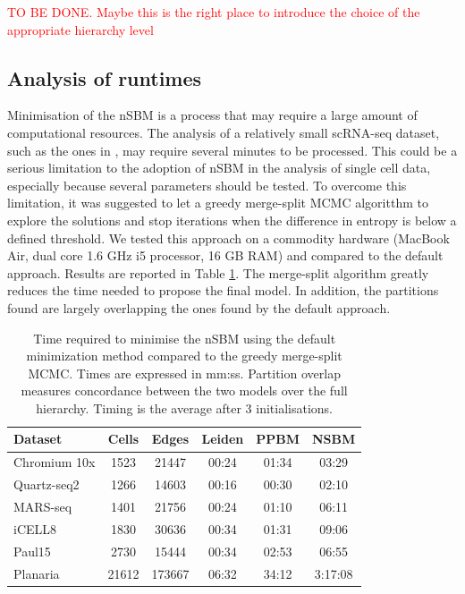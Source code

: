\documentclass[10pt]{article}
\begin{document}
\textcolor{red}{TO BE DONE. Maybe this is the right place to introduce the choice of the appropriate hierarchy level}


\subsection*{Analysis of runtimes}

Minimisation of the nSBM is a process that may require a large amount of computational resources. The analysis of a relatively small scRNA-seq dataset, such as the ones in \cite{mereu_2020}, may require several minutes to be processed. This could be a serious limitation to the adoption of nSBM in the analysis of single cell data, especially because several parameters should be tested. To overcome this limitation, it was suggested to let a greedy merge-split MCMC algoritthm \cite{peixoto_2020} to explore the solutions and stop iterations when the difference in entropy is below a defined threshold. We tested this approach on a commodity hardware (MacBook Air, dual core 1.6 GHz i5 processor, 16 GB RAM) and compared to the default approach. Results are reported in Table \ref{Table1}. The merge-split algorithm greatly reduces the time needed to propose the final model. In addition, the partitions found are largely overlapping the ones found by the default approach. 

\begin{table}[h!]
\centering
 \begin{tabular}{|| l c c c c c ||}
 \hline
 \textbf{Dataset} & \textbf{Cells} & \textbf{Edges} & \textbf{Leiden} & \textbf{PPBM} & \textbf{NSBM} \\ [0.5ex] 
 \hline\hline
 Chromium 10x \cite{mereu_2020} & 1523 & 21447 & 00:24 & 01:34 & 03:29\\ 
 \hline
 Quartz-seq2 \cite{mereu_2020} & 1266 & 14603 & 00:16 & 00:30 & 02:10 \\
 \hline
 MARS-seq \cite{mereu_2020} & 1401 & 21756 & 00:24 & 01:10 & 06:11 \\
 \hline
 iCELL8 \cite{mereu_2020} & 1830 & 30636 & 00:34 & 01:31 & 09:06 \\
 \hline
 Paul15 \cite{paul_2015} & 2730 & 15444 & 00:34 & 02:53 & 06:55\\ 
 \hline
 Planaria \cite{plass_2018} & 21612 & 173667 & 06:32 & 34:12 & 3:17:08 \\
 \hline
\end{tabular}
\caption{Time required to minimise the nSBM using the default minimization method compared to the greedy merge-split MCMC. Times are expressed in mm:ss. Partition overlap measures concordance between the two models over the full hierarchy. Timing is the average after 3 initialisations.}
\label{Table1}
\end{table}
\end{document}

